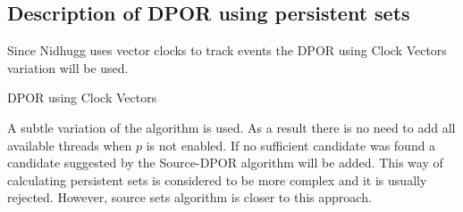 \subsection{Description of DPOR using persistent sets}

Since Nidhugg uses vector clocks to track events the DPOR using Clock Vectors variation will be used.

\begin{algorithm}
    \caption{DPOR using Clock Vectors}
\end{algorithm}

A subtle variation of the algorithm is used. As a result there is no need to add all available threads when $p$ is not enabled. If no sufficient candidate was found
a candidate suggested by the Source-DPOR algorithm will be added. This way of calculating persistent sets is considered to be more complex and it is usually
rejected. However, source sets algorithm is closer to this approach.

